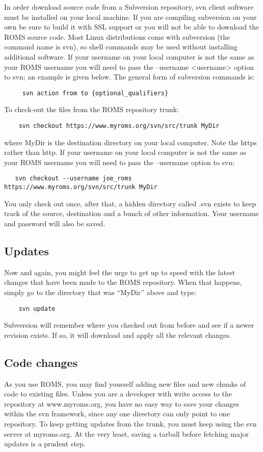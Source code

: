 In order download source code from a Subversion repository, svn
client software must be installed on your local machine. If you are
compiling subversion on your own be sure to build it with SSL
support or you will not be able to download the ROMS source code.
Most Linux distributions come with subversion (the command name is
svn), so shell commands may be used without installing additional
software. If your username on your local computer is not the same as
your ROMS username you will need to pass the --username <username>
option to svn; an example is given below. The general form of
subversion commands is: 
\begin{verbatim}
     svn action from to {optional_qualifiers} 
\end{verbatim}
To check-out the files from the ROMS repository trunk:
\begin{verbatim}
    svn checkout https://www.myroms.org/svn/src/trunk MyDir
\end{verbatim}
where MyDir is the destination directory on your local computer.
Note the https rather than http. If your username on your local
computer is not the same as your ROMS username you will need to pass
the --username option to svn:
\begin{verbatim}
   svn checkout --username joe_roms https://www.myroms.org/svn/src/trunk MyDir
\end{verbatim}
You only check out once, after that, a hidden directory called .svn
exists to keep track of the source, destination and a bunch of other
information. Your username and password will also be saved.

\subsection{Updates}
Now and again, you might feel the urge to get up to speed with the
latest changes that have been made to the ROMS repository. When that
happens, simply go to the directory that was ``MyDir'' above and
type:
\begin{verbatim}
    svn update
\end{verbatim}
Subversion will remember where you checked out from before and
see if a newer revision exists. If so, it will download and apply
all the relevant changes.

\subsection{Code changes}
As you use ROMS, you may find yourself adding new files and new chunks of
code to existing files. Unless you are a developer with write access to the
repository at www.myroms.org, you have no easy way to save your changes
within the svn framework, since any one directory can only point to one
repository. To keep getting updates from the trunk, you must keep using the
svn server at myroms.org. At the very least, saving a tarball before
fetching major updates is a prudent step.

